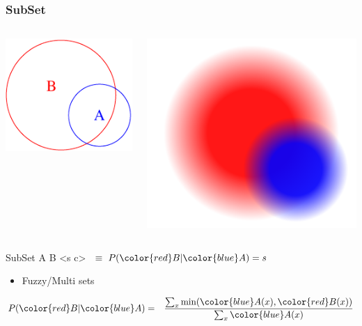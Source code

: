 \documentclass{beamer}
\begin{document}
\frame
{
  \frametitle{SubSet}

  \begin{columns}
    \column{1.5in}
    
    \includegraphics[scale=0.7]{subset_A_B.pdf}

    \column{1.5in}

    \includegraphics[scale=0.25]{Fuzzy_SubSet_A_B.png}

  \end{columns}

    SubSet {\color{blue}A} {\color{red}B} <s c>
    $\ \equiv\ P({\color{red}B}|{\color{blue}A})=s$\\[2ex]

  \begin{itemize}
  \item
    Fuzzy/Multi sets
  \end{itemize}

  \begin{eqnarray*}
    P({\color{red}B}|{\color{blue}A})
    &
    =
    &
    \frac{\sum_x \min({\color{blue}A}(x), {\color{red}B}(x))}
    {\sum_x {\color{blue}A}(x)}
  \end{eqnarray*}

}
\end{document}
